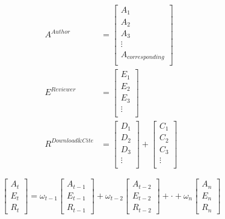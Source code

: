 \documentclass[lettersize,journal]{IEEEtran}
\begin{document}
\begin{equation}
  \begin{aligned}
    A^{Author}
    &= 
    \begin{bmatrix}
      A_{1} \\
      A_{2} \\
      A_{3} \\
      \vdots \\
      A_{corresponding} \\
    \end{bmatrix}\\
    E^{Reviewer}
    &= 
    \begin{bmatrix}
      E_{1} \\
      E_{2} \\
      E_{3} \\
      \vdots \\
    \end{bmatrix}\\
    R^{Download \& Cite}
    &= 
    \begin{bmatrix}
      D_{1} \\
      D_{2} \\
      D_{3} \\
      \vdots \\
    \end{bmatrix}
    +
    \begin{bmatrix}
      C_{1} \\
      C_{2} \\
      C_{3} \\
      \vdots \\
    \end{bmatrix}
  \end{aligned}
  \label{eq:reader}
\end{equation}



\begin{equation}
  \begin{bmatrix}
    A_t \\
    E_t \\
    R_t 
  \end{bmatrix}
  = 
  \omega_{t-1}
  \begin{bmatrix}
    A_{t-1} \\
    E_{t-1} \\
    R_{t-1}
  \end{bmatrix}
  +
  \omega_{t-2}
  \begin{bmatrix}
    A_{t-2} \\
    E_{t-2} \\
    R_{t-2}
  \end{bmatrix}
  +
  \cdot
  + 
  \omega_n
  \begin{bmatrix}
    A_n \\
    E_n \\
    R_n
  \end{bmatrix}
  \label{eq:dao}
\end{equation}
\end{document}
